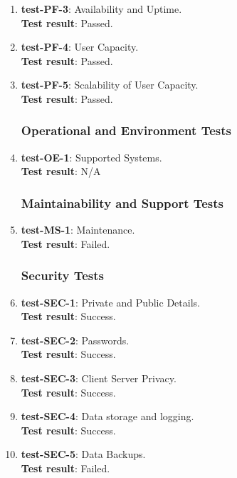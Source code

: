 \documentclass[12pt, titlepage]{article}
\begin{document}
\begin{enumerate}
	\item{\textbf{test-PF-3}}: Availability and Uptime.\\
	\textbf{Test result}: Passed.
	
	\item{\textbf{test-PF-4}}: User Capacity.\\
	\textbf{Test result}: Passed.
	
	\item{\textbf{test-PF-5}}: Scalability of User Capacity.\\
	\textbf{Test result}: Passed.
	
\subsubsection{Operational and Environment Tests}
	\item{\textbf{test-OE-1}}: Supported Systems.\\
	\textbf{Test result}: N/A
	
\subsubsection{Maintainability and Support Tests}
	\item{\textbf{test-MS-1}}: Maintenance.\\
	\textbf{Test result}: Failed.
	
\subsubsection{Security Tests}
	\item{\textbf{test-SEC-1}}: Private and Public Details.\\
	\textbf{Test result}: Success.
	
	\item{\textbf{test-SEC-2}}: Passwords.\\
	\textbf{Test result}: Success.
	
	\item{\textbf{test-SEC-3}}: Client Server Privacy.\\
	\textbf{Test result}: Success.
	
	\item{\textbf{test-SEC-4}}: Data storage and logging.\\
	\textbf{Test result}: Success.
	
	\item{\textbf{test-SEC-5}}: Data Backups.\\
	\textbf{Test result}: Failed.
	

\end{enumerate}
\end{document}
